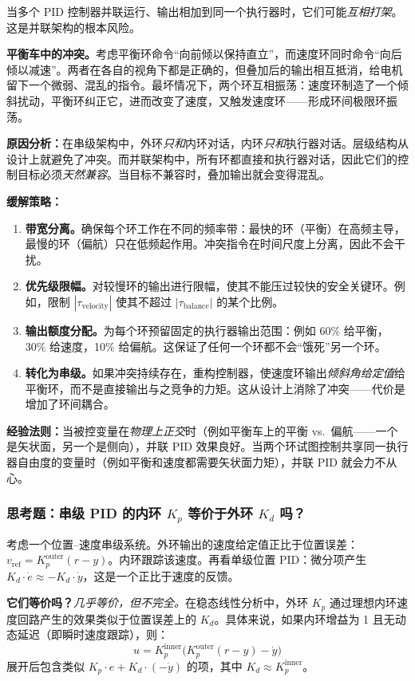 当多个 PID 控制器并联运行、输出相加到同一个执行器时，它们可能\textit{互相打架}。这是并联架构的根本风险。

\textbf{平衡车中的冲突。}考虑平衡环命令``向前倾以保持直立''，而速度环同时命令``向后倾以减速''。两者在各自的视角下都是正确的，但叠加后的输出相互抵消，给电机留下一个微弱、混乱的指令。最坏情况下，两个环互相振荡：速度环制造了一个倾斜扰动，平衡环纠正它，进而改变了速度，又触发速度环——形成环间极限环振荡。

\textbf{原因分析：}在串级架构中，外环\textit{只和}内环对话，内环\textit{只和}执行器对话。层级结构从设计上就避免了冲突。而并联架构中，所有环都直接和执行器对话，因此它们的控制目标必须\textit{天然兼容}。当目标不兼容时，叠加输出就会变得混乱。

\textbf{缓解策略：}
\begin{enumerate}[nosep]
    \item \textbf{带宽分离。}确保每个环工作在不同的频率带：最快的环（平衡）在高频主导，最慢的环（偏航）只在低频起作用。冲突指令在时间尺度上分离，因此不会干扰。
    \item \textbf{优先级限幅。}对较慢环的输出进行限幅，使其不能压过较快的安全关键环。例如，限制 $|\tau_{\text{velocity}}|$ 使其不超过 $|\tau_{\text{balance}}|$ 的某个比例。
    \item \textbf{输出额度分配。}为每个环预留固定的执行器输出范围：例如 60\% 给平衡，30\% 给速度，10\% 给偏航。这保证了任何一个环都不会``饿死''另一个环。
    \item \textbf{转化为串级。}如果冲突持续存在，重构控制器，使速度环输出\textit{倾斜角给定值}给平衡环，而不是直接输出与之竞争的力矩。这从设计上消除了冲突——代价是增加了环间耦合。
\end{enumerate}

\textbf{经验法则：}当被控变量在\textit{物理上正交}时（例如平衡车上的平衡 vs.\ 偏航——一个是矢状面，另一个是侧向），并联 PID 效果良好。当两个环试图控制共享同一执行器自由度的变量时（例如平衡和速度都需要矢状面力矩），并联 PID 就会力不从心。

\subsubsection{思考题：串级 PID 的内环 $K_p$ 等价于外环 $K_d$ 吗？}

考虑一个位置--速度串级系统。外环输出的速度给定值正比于位置误差：$v_{\text{ref}} = K_p^{\text{outer}} (r - y)$。内环跟踪该速度。再看单级位置 PID：微分项产生 $K_d \cdot \dot{e} \approx -K_d \cdot \dot{y}$，这是一个正比于速度的反馈。

\textbf{它们等价吗？}\textit{几乎等价，但不完全。}在稳态线性分析中，外环 $K_p$ 通过理想内环速度回路产生的效果类似于位置误差上的 $K_d$。具体来说，如果内环增益为 1 且无动态延迟（即瞬时速度跟踪），则：
\[
u = K_p^{\text{inner}} \bigl(K_p^{\text{outer}}(r-y) - \dot{y}\bigr)
\]
展开后包含类似 $K_p \cdot e + K_d \cdot (-\dot{y})$ 的项，其中 $K_d \approx K_p^{\text{inner}}$。

